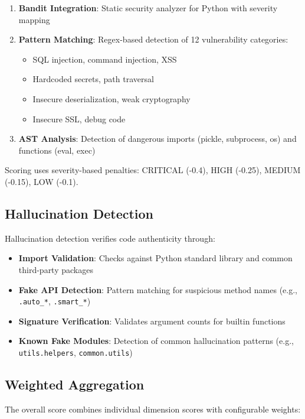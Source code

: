 \documentclass[12pt,a4paper]{article}
\begin{document}
\begin{enumerate}
    \item \textbf{Bandit Integration}: Static security analyzer for Python with severity mapping
    \item \textbf{Pattern Matching}: Regex-based detection of 12 vulnerability categories:
    \begin{itemize}
        \item SQL injection, command injection, XSS
        \item Hardcoded secrets, path traversal
        \item Insecure deserialization, weak cryptography
        \item Insecure SSL, debug code
    \end{itemize}
    \item \textbf{AST Analysis}: Detection of dangerous imports (pickle, subprocess, os) and functions (eval, exec)
\end{enumerate}

Scoring uses severity-based penalties: CRITICAL (-0.4), HIGH (-0.25), MEDIUM (-0.15), LOW (-0.1).

\subsection{Hallucination Detection}

Hallucination detection verifies code authenticity through:

\begin{itemize}
    \item \textbf{Import Validation}: Checks against Python standard library and common third-party packages
    \item \textbf{Fake API Detection}: Pattern matching for suspicious method names (e.g., \texttt{.auto\_*}, \texttt{.smart\_*})
    \item \textbf{Signature Verification}: Validates argument counts for builtin functions
    \item \textbf{Known Fake Modules}: Detection of common hallucination patterns (e.g., \texttt{utils.helpers}, \texttt{common.utils})
\end{itemize}

\subsection{Weighted Aggregation}

The overall score combines individual dimension scores with configurable weights:
\end{document}
